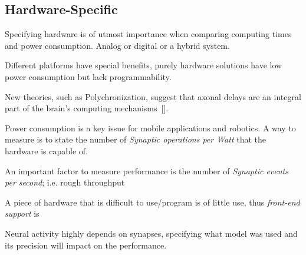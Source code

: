 \subsection{Hardware-Specific}
Specifying hardware is of utmost importance when comparing computing times and power consumption. Analog or digital or a hybrid system.

Different platforms have special benefits, purely hardware solutions have low power consumption but lack programmability.

New theories, such as Polychronization, suggest that axonal delays are an integral part of the brain's computing mechanisms~[\cite{Izhikevich2005}]. 

Power consumption is a key issue for mobile applications and robotics. A way to measure is to state the number of \emph{Synaptic operations per Watt} that the hardware is capable of.

An important factor to measure performance is the number of \emph{Synaptic events per second}; i.e. rough throughput

A piece of hardware that is difficult to use/program is of little use, thus \emph{front-end support} is

Neural activity highly depends on synapses, specifying what model was used and its precision will impact on the performance.

